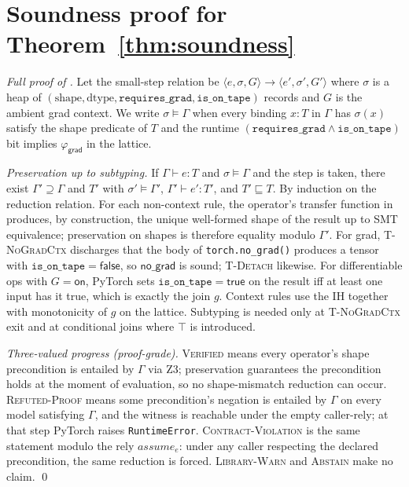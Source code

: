 \section{Soundness proof for Theorem~\ref{thm:soundness}}
\label{app:soundness}

\begin{proof}[Full proof of ]
Let the small-step relation be
$\langle e,\sigma,G\rangle\to\langle e',\sigma',G'\rangle$
where $\sigma$ is a heap of
$(\mathrm{shape},\mathrm{dtype},\mathtt{requires\_grad},
\mathtt{is\_on\_tape})$ records and $G$ is the ambient grad
context. We write $\sigma\models\Gamma$ when every binding
$x:T$ in $\Gamma$ has $\sigma(x)$ satisfy the shape predicate
of $T$ and the runtime
$(\mathtt{requires\_grad}\wedge\mathtt{is\_on\_tape})$ bit
implies $\varphi_{\mathsf{grad}}$ in the lattice.

\emph{Preservation up to subtyping.} If $\Gamma\vdash e:T$ and
$\sigma\models\Gamma$ and the step is taken, there exist
$\Gamma'\supseteq\Gamma$ and $T'$ with
$\sigma'\models\Gamma'$, $\Gamma'\vdash e':T'$, and
$T'\sqsubseteq T$. By induction on the reduction relation. For
each non-context rule, the operator's transfer function in
 produces, by construction, the
unique well-formed shape of the result up to SMT equivalence;
preservation on shapes is therefore equality modulo $\Gamma'$.
For grad, \textsc{T-NoGradCtx} discharges that the body of
\texttt{torch.no\_grad()} produces a tensor with
$\mathtt{is\_on\_tape}=\mathsf{false}$, so $\mathsf{no\_grad}$
is sound; \textsc{T-Detach} likewise. For differentiable ops
with $G=\mathsf{on}$, PyTorch sets
$\mathtt{is\_on\_tape}=\mathsf{true}$ on the result iff at
least one input has it true, which is exactly the join $g$.
Context rules use the IH together with monotonicity of $g$ on
the lattice. Subtyping is needed only at \textsc{T-NoGradCtx}
exit and at conditional joins where $\top$ is introduced.

\emph{Three-valued progress (proof-grade).} \textsc{Verified}
means every operator's shape precondition is entailed by
$\Gamma$ via Z3; preservation guarantees the precondition holds
at the moment of evaluation, so no shape-mismatch reduction can
occur. \textsc{Refuted-Proof} means some precondition's
negation is entailed by $\Gamma$ on every model satisfying
$\Gamma$, and the witness is reachable under the empty
caller-rely; at that step PyTorch raises
\texttt{RuntimeError}. \textsc{Contract-Violation} is the same
statement modulo the rely $\mathit{assume}_e$: under any caller
respecting the declared precondition, the same reduction is
forced. \textsc{Library-Warn} and \textsc{Abstain} make no
claim. \qed
\end{proof}

